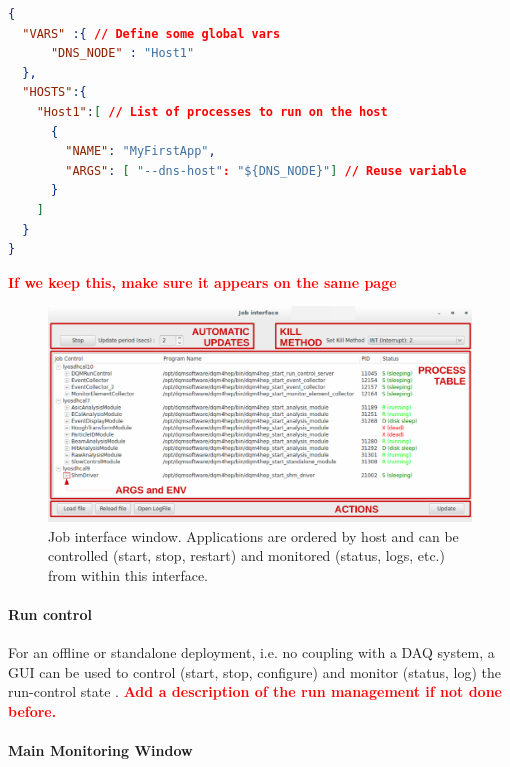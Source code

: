 \documentclass{webofc}
\begin{document}
\begin{lstlisting}[label={lst:jsonConfig}, language=json]
{
  "VARS" :{ // Define some global vars
      "DNS_NODE" : "Host1"
  },
  "HOSTS":{ 
    "Host1":[ // List of processes to run on the host
      { 
        "NAME": "MyFirstApp",
        "ARGS": [ "--dns-host": "${DNS_NODE}"] // Reuse variable
      }
    ]
  }
}
\end{lstlisting}
\textcolor{red}{\textbf{If we keep this, make sure it appears on the same page}}

\begin{figure}
\centering
\includegraphics[width=.95\textwidth]{figs/JobControlInterface.pdf}
\caption{Job interface window. Applications are ordered by host and can be controlled (start, stop, restart) and monitored (status, logs, etc.) from within this interface.}
\label{fig:JobControlGUI}
\end{figure}


\paragraph{Run control}\label{par:RunControl}

For an offline or standalone deployment, i.e. no coupling with a DAQ system, a GUI can be used to control (start, stop, configure) and monitor (status, log) the run-control state . \textcolor{red}{\textbf{Add a description of the run management if not done before.}} 

\paragraph{Main Monitoring Window}\label{par:MainGUI}
\end{document}

